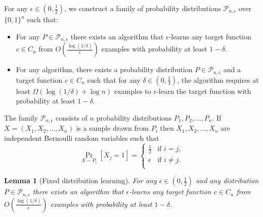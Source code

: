 \documentclass[12pt]{article}
\newtheorem{lemma}[proposition]{Lemma}
\renewcommand{\P}{\mathcal{P}}
\begin{document}
For any $\epsilon \in (0,\frac{1}{2})$,
we construct a family of probability distributions $\P_{n,\epsilon}$ over $\{0,1\}^n$ such that:
\begin{itemize}
\item For any $P \in \P_{n,\epsilon}$ there exists an algorithm that $\epsilon$-learns
any target function $c \in C_n$ from $O \left( \frac{\log(1/\delta)}{\epsilon} \right)$ examples
with probability at least $1-\delta$.
\item For any algorithm, there exists
a probability distribution $P \in \P_{n,\epsilon}$ and a target function $c \in C_n$
such that for any $\delta \in (0,\frac{1}{4})$, the algorithm requires
at least $\Omega(\log(1/\delta) + \log n)$ examples to $\epsilon$-learn
the target function with probability at least $1-\delta$.
\end{itemize}

The family $\P_{n,\epsilon}$ consists of $n$ probability distributions $P_1, P_2, \dots, P_n$.
If $X = (X_1, X_2, \dots, X_n)$ is a sample drawn from $P_i$ then $X_1, X_2, \dots, X_n$
are independent Bernoulli random variables such that
$$
\Pr_{X \sim P_i}[X_j = 1] =
\begin{cases}
\frac{1}{2} & \text{if $i = j$,} \\
\epsilon & \text{if $i \neq j$.} \\
\end{cases}
$$

\begin{lemma}[Fixed distribution learning]
For any $\epsilon \in (0,\frac{1}{2})$ and any distribution $P \in
\P_{n,\epsilon}$ there exists an algorithm that $\epsilon$-learns any target
function $c \in C_n$ from $O \left( \frac{\log(1/\delta)}{\epsilon} \right)$
examples with probability at least $1 - \delta$.
\end{lemma}
\end{document}

